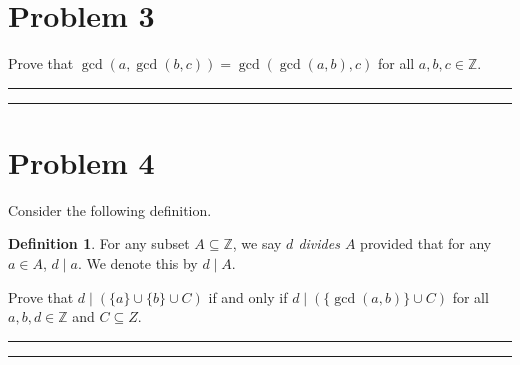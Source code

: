\documentclass{article}
\theoremstyle{definition}
\newtheorem*{definition}{Definition} %
\newenvironment{solution}{\bigskip\hrule{\hfill}}{\bigskip\hrule{\hfill}} %
\begin{document}

\newpage


\section*{Problem 3}
Prove that $\gcd\left(a,\gcd\left(b,c\right)\right)=\gcd\left(\gcd\left(a,b\right),c\right)$ for all $a,b,c\in\mathbb{Z}$.
\begin{solution}


\end{solution}


\newpage


\section*{Problem 4}
Consider the following definition.
\begin{definition}
    For any subset $A\subseteq\mathbb{Z}$, we say \emph{$d$ divides $A$} provided that for any $a\in A$, $d\mid a$. We denote this by $d\mid A$.
\end{definition}
Prove that $d\mid\left(\{a\}\cup\{b\}\cup C\right)$ if and only if $d\mid\left(\{\gcd\left(a,b\right)\}\cup C\right)$ for all $a,b,d\in\mathbb{Z}$ and $C\subseteq Z$.
\begin{solution}


\end{solution}


\newpage

\end{document}
